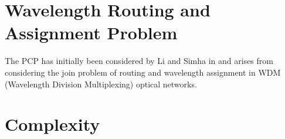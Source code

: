 \section{Wavelength Routing and Assignment Problem}

The PCP has initially been considered by Li and Simha in \cite{li-00} and arises from considering the join problem of routing and wavelength assignment in WDM (Wavelength Division Multiplexing) optical networks. 


\section{Complexity}

%


